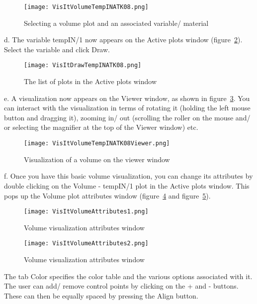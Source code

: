 \begin{figure}
  \center
  \texttt{[image: VisItVolumeTempINATK08.png]}
  \caption{Selecting a volume plot and an associated variable/ material}
  \label{VisItVolumeTempINATK08}
\end{figure}

d. The variable tempIN/1 now appears on the Active plots window (figure~\ref{VisItDrawTempINATK08}). Select the variable and click Draw.

\begin{figure}
  \center
  \texttt{[image: VisItDrawTempINATK08.png]}
  \caption{The list of plots in the Active plots window}
  \label{VisItDrawTempINATK08}
\end{figure}

e. A visualization now appears on the Viewer window, as shown in figure~\ref{VisItVolumeTempINATK08Viewer}. You can interact with the visualization in terms of rotating it (holding the left mouse button and dragging it), zooming in/ out (scrolling the roller on the mouse and/ or selecting the magnifier at the top of the Viewer window) etc.

\begin{figure}
  \center
  \texttt{[image: VisItVolumeTempINATK08Viewer.png]}
  \caption{Visualization of a volume on the viewer window}
  \label{VisItVolumeTempINATK08Viewer}
\end{figure}

f. Once you have this basic volume visualization, you can change its attributes by double clicking on the Volume - tempIN/1 plot in the Active plots window. This pops up the Volume plot attributes window (figure~\ref{VisItVolumeAttributes1} and figure~\ref{VisItVolumeAttributes2}).

\begin{figure}
  \center
  \texttt{[image: VisItVolumeAttributes1.png]}
  \caption{Volume visualization attributes window}
  \label{VisItVolumeAttributes1}
\end{figure}

\begin{figure}
  \center
  \texttt{[image: VisItVolumeAttributes2.png]}
  \caption{Volume visualization attributes window}
  \label{VisItVolumeAttributes2}
\end{figure}

The tab Color specifies the color table and the various options associated with it. The user can add/ remove control points by clicking on the + and - buttons. These can then be equally spaced by pressing the Align button.

